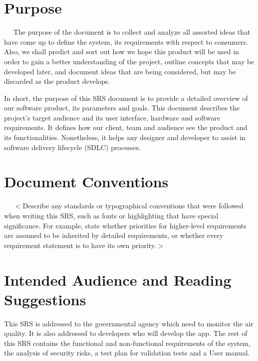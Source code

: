\documentclass{report}
\begin{document}
\section{Purpose} ~~
The purpose of the document is to collect and analyze all assorted ideas that
have come up to define the system, its requirements with respect to consumers.
Also, we shall predict and sort out how we hope this product will be used in
order to gain a better understanding of the project, outline concepts that may
be developed later, and document ideas that are being considered, but may be
discarded as the product develops.

In short, the purpose of this SRS document is to provide a detailed overview
of our software product, its parameters and goals. This document describes the
project's target audience and its user interface, hardware and software
requirements. It defines how our client, team and audience see the product
and its functionalities. Nonetheless, it helps any designer and developer to
assist in software delivery lifecycle (SDLC) processes.


\section{Document Conventions} ~~
$<$Describe any standards or typographical conventions that were followed when
writing this SRS, such as fonts or highlighting that have special significance.
For example, state whether priorities  for higher-level requirements are assumed
to be inherited by detailed requirements, or whether every requirement statement
is to have its own priority.$>$

\section{Intended Audience and Reading Suggestions}
This SRS is addressed to the governmental agency which need to monitor the air
quality. It is also addressed to developers who will develop the app. The rest of this
SRS contains the functional and non-functional requirements of the system, the analysis
of security risks, a test plan for validation tests and a User manual.
\end{document}
